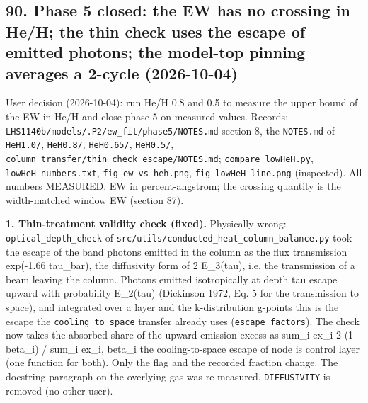\documentclass[english,a4paper]{my_memo}
\begin{document}
\subsection{90. Phase 5 closed: the EW has no crossing in He/H; the thin check uses the escape of emitted photons; the model-top pinning averages a 2-cycle (2026-10-04)}\label{90-phase-5-closed-the-ew-has-no-crossing-in-heh-the-thin-check-uses-the-escape-of-emitted-photons-the-model-top-pinning-averages-a-2-cycle-2026-10-04}

User decision (2026-10-04): run He/H 0.8 and 0.5 to measure the upper bound
of the EW in He/H and close phase 5 on measured values. Records:
\texttt{LHS1140b/models/.P2/ew\_fit/phase5/NOTES.md} section 8, the \texttt{NOTES.md} of
\texttt{HeH1.0/}, \texttt{HeH0.8/}, \texttt{HeH0.65/}, \texttt{HeH0.5/},
\texttt{column\_transfer/thin\_check\_escape/NOTES.md}; \texttt{compare\_lowHeH.py},
\texttt{lowHeH\_numbers.txt}, \texttt{fig\_ew\_vs\_heh.png}, \texttt{fig\_lowHeH\_line.png}
(inspected). All numbers MEASURED. EW in percent-angstrom; the crossing
quantity is the width-matched window EW (section 87).

\textbf{1. Thin-treatment validity check (fixed).} Physically wrong:
\texttt{optical\_depth\_check} of \texttt{src/utils/conducted\_heat\_column\_balance.py} took
the escape of the band photons emitted in the column as the flux
transmission exp(-1.66 tau\_bar), the diffusivity form of 2 E\_3(tau), i.e.
the transmission of a beam leaving the column. Photons emitted
isotropically at depth tau escape upward with probability E\_2(tau)
(Dickinson 1972, Eq. 5 for the transmission to space), and integrated over
a layer and the k-distribution g-points this is the escape the
\texttt{cooling\_to\_space} transfer already uses (\texttt{escape\_factors}). The check now
takes the absorbed share of the upward emission excess as
sum\_i ex\_i 2 (1 - beta\_i) / sum\_i ex\_i, beta\_i the cooling-to-space escape
of node i\textquotesingle s control layer (one function for both). Only the flag and the
recorded fraction change. The docstring paragraph on the overlying gas was
re-measured. \texttt{DIFFUSIVITY} is removed (no other user).
\end{document}
